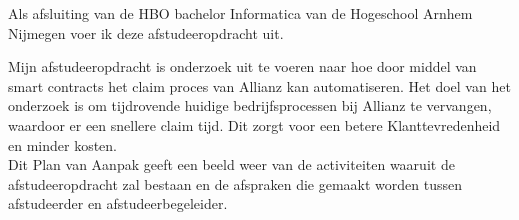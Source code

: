 Als afsluiting van de HBO bachelor Informatica van de Hogeschool Arnhem Nijmegen voer ik deze afstudeeropdracht uit.

Mijn afstudeeropdracht is onderzoek uit te voeren naar hoe door middel van smart contracts het claim proces van Allianz kan automatiseren.
Het doel van het onderzoek is om tijdrovende huidige bedrijfsprocessen bij Allianz te vervangen, waardoor er een snellere claim tijd. Dit zorgt voor een betere Klanttevredenheid en minder kosten.
\\
Dit Plan van Aanpak geeft een beeld weer van de activiteiten waaruit de afstudeeropdracht zal bestaan en de afspraken die gemaakt worden tussen afstudeerder en afstudeerbegeleider.